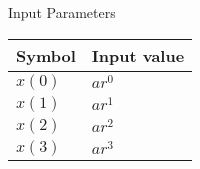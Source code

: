 \setlength{\arrayrulewidth}{0.3mm}
\setlength{\tabcolsep}{12pt}
\renewcommand{\arraystretch}{1.3}


\begin{center}
\caption{Input Parameters}
\begin{tabular}{ |p{2.0cm}|p{2.0cm}| }

\hline
 {Symbol}&{Input value}\\
\hline
$x(0) $ & $ar^0$ \\
\hline
$x(1) $ & $ar^1$ \\
\hline
$x(2) $ & $ar^2$ \\
\hline
$x(3) $ & $ar^3$ \\
\hline

\end{tabular}
\end{center}

